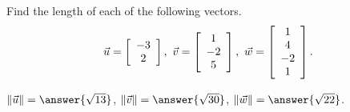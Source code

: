 \documentclass{ximera}
\author{Zack Reed}
\begin{document}
\begin{exercise}
  Find the length of each of the following vectors.
\begin{equation*}
  \vect{u}=\startmat{c}-3\\2\stopmat, \quad
  \vect{v}=\startmat{c}1\\-2\\5\stopmat, \quad
  \vect{w}=\startmat{c}1\\4\\-2\\1\stopmat.
\end{equation*}

$\norm{\vect{u}} = \answer{\sqrt{13}}$, $\norm{\vect{v}} = \answer{\sqrt{30}}$,
    $\norm{\vect{w}} = \answer{\sqrt{22}}$.

\end{exercise}
\end{document}
